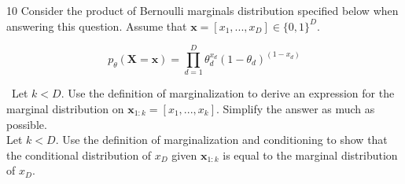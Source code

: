 \documentclass[11pt]{article}
\newcommand{\mbf}[1]{{\mathbf{#1}}}
\begin{document}
\begin{problem}{10} Consider the product of Bernoulli marginals distribution specified below when answering this question. Assume that $\mbf{x}=[x_1,...,x_D]\in\{0,1\}^D$.

$$p_{\theta}(\mbf{X}=\mbf{x}) = \prod_{d=1}^D \theta_d^{x_d} (1-\theta_d)^{(1-x_d)}$$

 ~Let $k<D$. Use the definition of marginalization to derive an expression for the marginal distribution on $\mbf{x}_{1:k}=[x_1,...,x_k]$. Simplify the answer as much as possible.\\

 Let $k<D$. Use the definition of marginalization and conditioning to show that the conditional distribution of $x_D$ given $\mbf{x}_{1:k}$ is equal to the marginal distribution of $x_D$. 

\end{problem}
\end{document}
